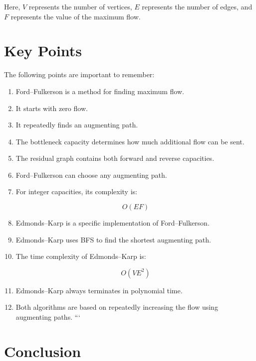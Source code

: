 \documentclass[12pt,a4paper]{article}
\begin{document}
Here, $V$ represents the number of vertices, $E$ represents the number
of edges, and $F$ represents the value of the maximum flow.

\section{Key Points}

The following points are important to remember:

\begin{enumerate}

```
\item Ford--Fulkerson is a method for finding maximum flow.

\item It starts with zero flow.

\item It repeatedly finds an augmenting path.

\item The bottleneck capacity determines how much additional flow
can be sent.

\item The residual graph contains both forward and reverse
capacities.

\item Ford--Fulkerson can choose any augmenting path.

\item For integer capacities, its complexity is:

\[
O(EF)
\]

\item Edmonds--Karp is a specific implementation of
Ford--Fulkerson.

\item Edmonds--Karp uses BFS to find the shortest augmenting path.

\item The time complexity of Edmonds--Karp is:

\[
O(VE^2)
\]

\item Edmonds--Karp always terminates in polynomial time.

\item Both algorithms are based on repeatedly increasing the flow
using augmenting paths.
```

\end{enumerate}

\section{Conclusion}
\end{document}
